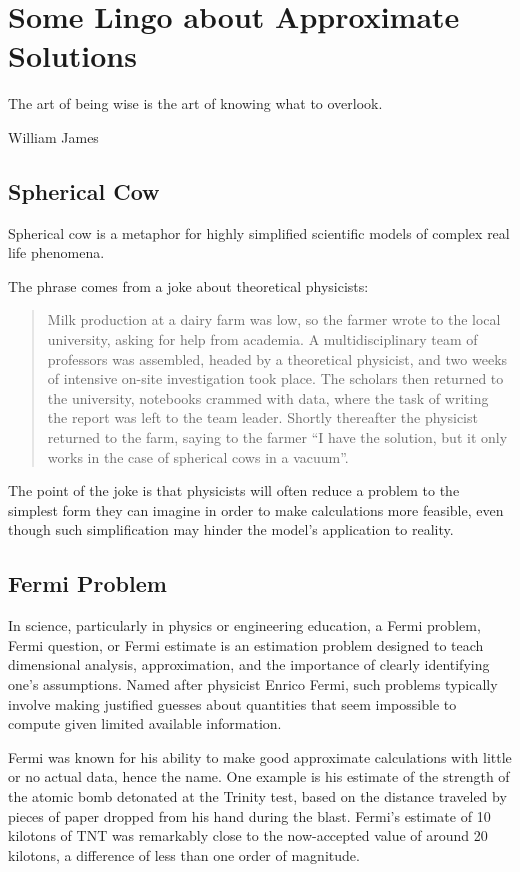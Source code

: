 \section{Some Lingo about Approximate Solutions}


\epigraph{The art of being wise is the art of knowing what to overlook.}{William James}{}


\subsection{Spherical Cow}
Spherical cow is a metaphor for highly simplified scientific models of complex real life phenomena.

The phrase comes from a joke about theoretical physicists:
\begin{quote}
Milk production at a dairy farm was low, so the farmer wrote to the local university, asking for help from academia. A multidisciplinary team of professors was assembled, headed by a theoretical physicist, and two weeks of intensive on-site investigation took place. The scholars then returned to the university, notebooks crammed with data, where the task of writing the report was left to the team leader. Shortly thereafter the physicist returned to the farm, saying to the farmer ``I have the solution, but it only works in the case of spherical cows in a vacuum''.
\end{quote}

The point of the joke is that physicists will often reduce a problem to the simplest form they can imagine in order to make calculations more feasible, even though such simplification may hinder the model's application to reality.


\subsection{Fermi Problem}
In science, particularly in physics or engineering education, a Fermi problem, Fermi question, or Fermi estimate is an estimation problem designed to teach dimensional analysis, approximation, and the importance of clearly identifying one's assumptions. Named after physicist Enrico Fermi, such problems typically involve making justified guesses about quantities that seem impossible to compute given limited available information.

Fermi was known for his ability to make good approximate calculations with little or no actual data, hence the name. One example is his estimate of the strength of the atomic bomb detonated at the Trinity test, based on the distance traveled by pieces of paper dropped from his hand during the blast. Fermi's estimate of 10 kilotons of TNT was remarkably close to the now-accepted value of around 20 kilotons, a difference of less than one order of magnitude.


